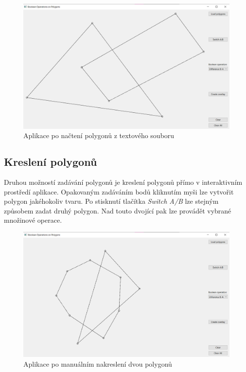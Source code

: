 \documentclass[11pt]{article}
\begin{document}
\begin{figure}[htbh]
	\centering
	\captionsetup{justification=centering}
	\includegraphics[scale=0.42]{images/vystup_LoadPoints.png} 
	\caption{Aplikace po načtení polygonů z textového souboru}
	\label{fig:vystup_LoadPoints}	
\end{figure} 
\FloatBarrier

\subsection{Kreslení polygonů}
Druhou možností zadávání polygonů je kreslení polygonů přímo v interaktivním prostředí aplikace. Opakovaným zadáváním bodů kliknutím myši lze vytvořit polygon jakéhokoliv tvaru. Po stisknutí tlačítka \textit{Switch A/B} lze stejným způsobem zadat druhý polygon. Nad touto dvojící pak lze provádět vybrané množinové operace.

\begin{figure}[htbh]
	\centering
	\captionsetup{justification=centering}
	\includegraphics[scale=0.42]{images/vstup_kresleni.png} 
	\caption{Aplikace po manuálním nakreslení dvou polygonů}
	\label{fig:vstup_kresleni}	
\end{figure} 
\FloatBarrier
\end{document}
